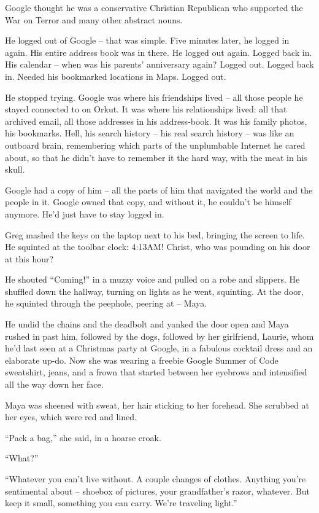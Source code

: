 Google thought he was a conservative Christian Republican who supported 
the War on Terror and many other abstract nouns.

He logged out of Google -- that was simple. Five minutes later, he 
logged in again. His entire address book was in there. He logged out 
again. Logged back in. His calendar -- when was his parents' 
anniversary again? Logged out. Logged back in. Needed his bookmarked 
locations in Maps. Logged out.

He stopped trying. Google was where his friendships lived -- all those 
people he stayed connected to on Orkut. It was where his relationships 
lived: all that archived email, all those addresses in his 
address-book. It was his family photos, his bookmarks. Hell, his search 
history -- his real search history -- was like an outboard brain, 
remembering which parts of the unplumbable Internet he cared about, so 
that he didn't have to remember it the hard way, with the meat in his 
skull.

Google had a copy of him -- all the parts of him that navigated the 
world and the people in it. Google owned that copy, and without it, he 
couldn't be himself anymore. He'd just have to stay logged in.

\tb

Greg mashed the keys on the laptop next to his bed, bringing the screen 
to life. He squinted at the toolbar clock: 4:13AM! Christ, who was 
pounding on his door at this hour?

He shouted “Coming!” in a muzzy voice and pulled on a robe and 
slippers. He shuffled down the hallway, turning on lights as he went, 
squinting. At the door, he squinted through the peephole, peering at -- 
Maya.

He undid the chains and the deadbolt and yanked the door open and Maya 
rushed in past him, followed by the dogs, followed by her girlfriend, 
Laurie, whom he'd last seen at a Christmas party at Google, in a 
fabulous cocktail dress and an elaborate up-do. Now she was wearing a 
freebie Google Summer of Code sweatshirt, jeans, and a frown that 
started between her eyebrows and intensified all the way down her face.

Maya was sheened with sweat, her hair sticking to her forehead. She 
scrubbed at her eyes, which were red and lined.

“Pack a bag,” she said, in a hoarse croak.

“What?”

“Whatever you can't live without. A couple changes of clothes. 
Anything you're sentimental about -- shoebox of pictures, your 
grandfather's razor, whatever. But keep it small, something you can 
carry. We're traveling light.”

